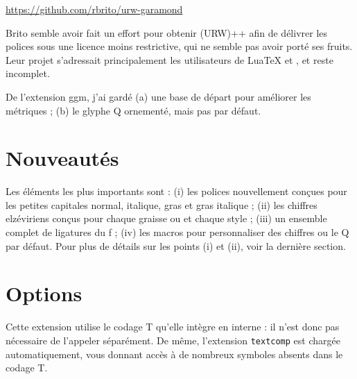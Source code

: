 \documentclass[12pt,english,french]{article}
\newcommand{\mnu}[1]{\textsf{#1}}
\newcommand{\cmd}[1]{\texttt{#1}}
\begin{document}
\noindent\url{https://github.com/rbrito/urw-garamond}

Brito semble avoir fait un effort pour obtenir (URW)++ afin de délivrer les polices sous une licence moins restrictive, qui ne semble pas avoir porté ses fruits. Leur projet s'adressait principalement les utilisateurs de Lua\TeX{} et \XeLaTeX, et reste incomplet.

De l'extension \mnu{ggm}, j'ai gardé (a) une base de départ pour améliorer les métriques ; (b) le glyphe Q ornementé, mais pas par défaut.

\section{Nouveautés}

Les éléments les plus importants sont : (i) les polices nouvellement conçues pour les petites capitales normal, italique, gras et gras italique ; (ii) les chiffres elzéviriens conçus pour chaque graisse ou et chaque style ; (iii) un ensemble complet de ligatures du f ; (iv) les macros pour personnaliser des chiffres ou le Q par défaut. Pour plus de détails sur les points (i) et (ii), voir la dernière section.

\section{Options}

Cette extension utilise le codage T qu'elle intègre en interne : il n'est donc pas nécessaire de l'appeler séparément. De même, l'extension \cmd{textcomp} est chargée automatiquement, vous donnant accès à de nombreux symboles absents dans le codage T.
\end{document}
